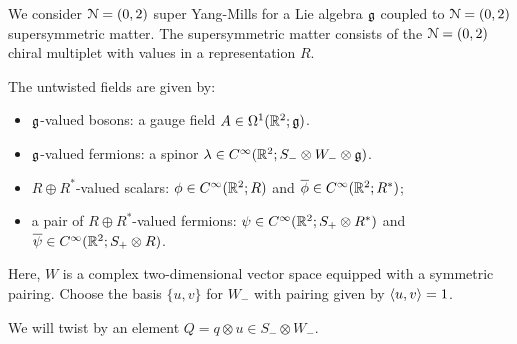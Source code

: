 \documentclass[10pt, oneside]{article}
\begin{document}
We consider $\mathcal N=(0,2)$ super Yang-Mills for a Lie algebra $\mathfrak g$ coupled to $\mathcal N=(0,2)$ supersymmetric matter. 
The supersymmetric matter consists of the $\mathcal N = (0,2)$ chiral multiplet with values in a representation $R$. 


The untwisted fields are given by:
\begin{itemize}
\item $\mathfrak g$-valued bosons: a gauge field $A \in \Omega^1(\mathbb R^2;\mathfrak g)$.
\item $\mathfrak g$-valued fermions: a spinor $\lambda \in C^\infty(\mathbb R^2 ; S_- \otimes W_- \otimes \mathfrak g)$. 
\item $R \oplus R^*$-valued scalars: $\phi \in C^\infty(\mathbb R^2 ; R)$ and $\overline{\phi} \in C^\infty(\mathbb R^2 ; R^*)$;
\item a pair of $R \oplus R^*$-valued fermions: $\psi \in C^\infty(\mathbb R^2 ; S_+ \otimes R^*)$  and $\overline{\psi} \in C^\infty(\mathbb R^2 ; S_+ \otimes R)$.
\end{itemize}
Here, $W$ is a complex two-dimensional vector space equipped with a symmetric pairing. 
Choose the basis $\{u,v\}$ for $W_-$ with pairing given by $\langle u, v\rangle = 1$. 

We will twist by an element $Q = q \otimes u \in S_- \otimes W_-$. 
\end{document}
